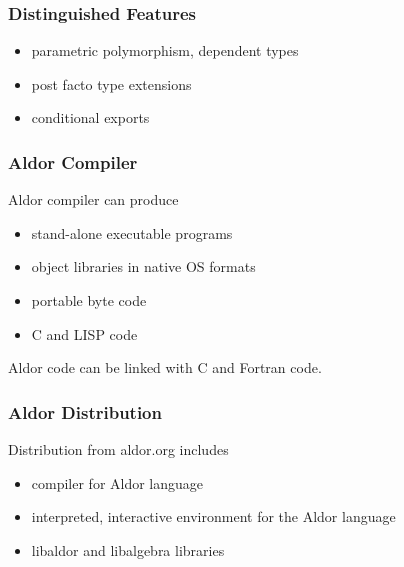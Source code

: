 \begin{frame}
  \frametitle{Distinguished Features}
  \begin{itemize}
  \item parametric polymorphism, dependent types
  \item post facto type extensions
  \item conditional exports
  \end{itemize}
\end{frame}








\begin{frame}
  \frametitle{Aldor Compiler}

  Aldor compiler can produce
  \begin{itemize}
  \item stand-alone executable programs
  \item object libraries in native OS formats
  \item portable byte code
  \item C and LISP code
  \end{itemize}

  Aldor code can be linked with C and Fortran code.
\end{frame}








\begin{frame}
  \frametitle{Aldor Distribution}

  Distribution from aldor.org includes
  \begin{itemize}
  \item compiler for Aldor language
  \item interpreted, interactive environment for the Aldor language
  \item libaldor and libalgebra libraries
  \end{itemize}
\end{frame}














